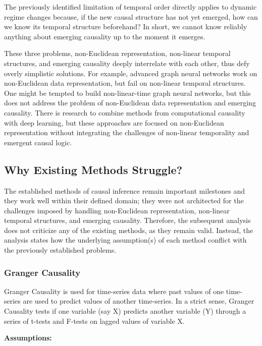 \documentclass{article}
\begin{document}
The previously identified limitation of temporal order directly applies to dynamic regime changes because, if the new causal structure has not yet emerged, how can we know its temporal structure beforehand? In short, we cannot know reliably anything about emerging causality up to the moment it emerges.

These three problems, non-Euclidean representation, non-linear temporal structures, and emerging causality deeply interrelate with each other, thus defy overly simplistic solutions. For example, advanced graph neural networks work on non-Euclidean data representation, but fail on non-linear temporal structures. One might be tempted to build non-linear-time graph neural networks, but this does not address the problem of non-Euclidean data representation and emerging causality. There is research to combine methods from computational causality with deep learning, but these approaches are focused on non-Euclidean representation without integrating the challenges of non-linear temporality and emergent causal logic.


\newpage

\subsection{Why Existing Methods Struggle?}

The established methods of causal inference remain important milestones and they work well within their defined domain; they were not architected for the challenges imposed by handling non-Euclidean representation, non-linear temporal structures, and emerging causality. Therefore, the subsequent analysis does not criticize any of the existing methods, as they remain valid. Instead, the analysis states how the underlying assumption(s) of each method conflict with the previously established problems.

\subsubsection{Granger Causality}

Granger Causality\cite{granger1969causal} is used for time-series data where past values of one time-series are used to predict values of another time-series. In a strict sense, Granger Causality tests if one variable (say X) predicts another variable (Y) through a series of t-tests and F-tests on lagged values of variable X.

\textbf{Assumptions:}
\end{document}
